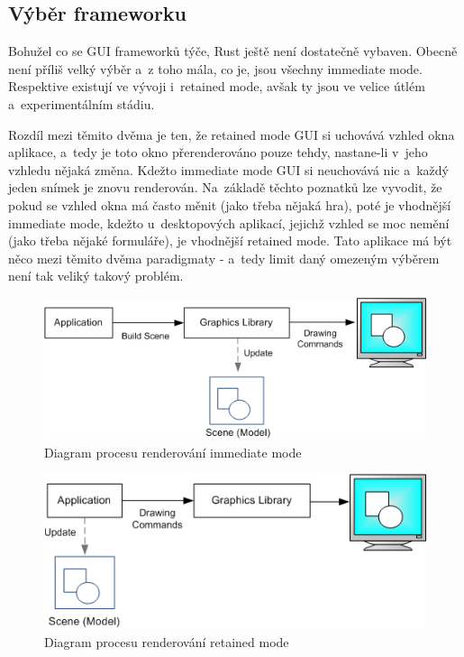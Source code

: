 \documentclass[a4paper, 12pt]{article} %
\begin{document}
	\subsection{Výběr frameworku}
		Bohužel co se GUI frameworků týče, Rust ještě není dostatečně vybaven. Obecně není příliš velký výběr a~z toho mála, co je, jsou všechny immediate mode. Respektive existují ve vývoji i~retained mode, avšak ty jsou ve velice útlém a~experimentálním stádiu.

		Rozdíl mezi těmito dvěma je ten, že retained mode GUI si uchovává vzhled okna aplikace, a~tedy je toto okno přerenderováno pouze tehdy, nastane-li v~jeho vzhledu nějaká změna. Kdežto immediate mode GUI si neuchovává nic a~každý jeden snímek je znovu renderován. Na~základě těchto poznatků lze vyvodit, že pokud se vzhled okna má často měnit (jako třeba nějaká hra), poté je vhodnější immediate mode, kdežto u~desktopových aplikací, jejichž vzhled se moc nemění (jako třeba nějaké formuláře), je vhodnější retained mode. Tato aplikace má být něco mezi těmito dvěma paradigmaty - a~tedy limit daný omezeným výběrem není tak veliký takový problém.
		\begin{center}
			\begin{figure}[H]
				\centering
				\includegraphics[width=.82\linewidth]{imm_mod}
				\caption{Diagram procesu renderování immediate mode\cite{imm_mod}}
				\label{fig:imm_mod}
			\end{figure}
		\end{center}
		\begin{center}
			\begin{figure}[H]
				\centering
				\includegraphics[width=.82\linewidth]{ret_mod}
				\caption{Diagram procesu renderování retained mode\cite{ret_mod}}
				\label{fig:ret_mod}
			\end{figure}
		\end{center}
		
\end{document}
